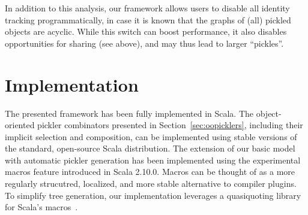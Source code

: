 \documentclass[preprint,10pt]{sigplanconf}
\theoremstyle{definition}
\theoremstyle{definition}
\newcommand{\todo}{{\bf \colorbox{red}{\color{white}TODO:}}}
\begin{document}
In addition to this analysis, our framework allows users to disable all
identity tracking programmatically, in case it is known that the graphs of
(all) pickled objects are acyclic. While this switch can boost performance, it
also disables opportunities for sharing (see above), and may thus lead to
larger ``pickles''.



\section{Implementation}

The presented framework has been fully implemented in Scala.
The object-oriented pickler combinators presented in
Section~\ref{sec:oopicklers}, including their implicit selection and
composition, can be implemented using stable versions of the standard, open-source
Scala distribution. The extension of our basic model with
automatic pickler generation has been implemented using the experimental
macros feature introduced in Scala 2.10.0. Macros can be thought of as a
more regularly strucutred, localized, and more stable alternative to compiler
plugins. To simplify tree generation, our implementation leverages a
quasiquoting library for Scala's macros~\cite{Quasiquotes}.









\end{document}
